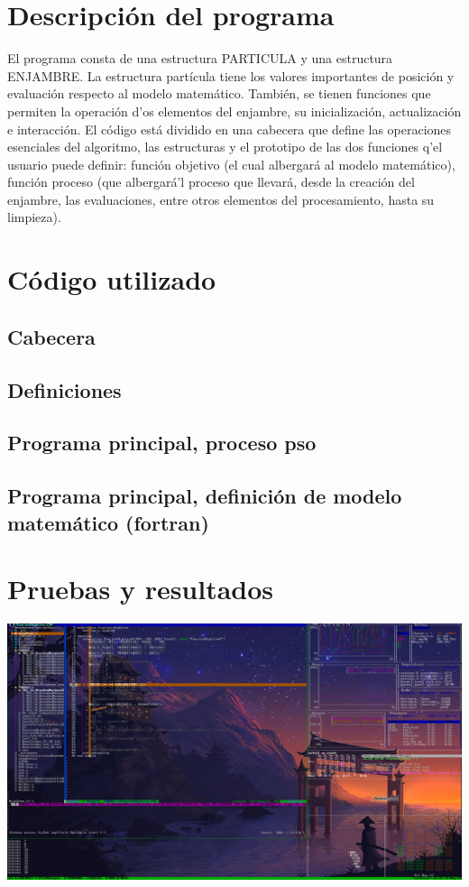 \documentclass[12pt,letterpaper]{report}
\begin{document}
  \section*{Descripción del programa}
  El programa consta de una estructura PARTICULA y una estructura ENJAMBRE. La estructura partícula tiene los valores
  importantes de posición y evaluación respecto al modelo matemático. También, se tienen funciones que permiten la
  operación d'os elementos del enjambre, su inicialización, actualización e interacción.
  El código está dividido en una cabecera que define las operaciones esenciales del algoritmo, las estructuras y el
  prototipo de las dos funciones q'el usuario puede definir: función objetivo (el cual albergará al modelo
  matemático), función proceso (que albergará'l proceso que llevará, desde la creación del enjambre, las evaluaciones,
  entre otros elementos del procesamiento, hasta su limpieza).
  \section*{Código utilizado}
  \subsection*{Cabecera}
  \newpage
  \subsection*{Definiciones}
  \newpage
  \subsection*{Programa principal, proceso pso}
  \newpage
  \subsection*{Programa principal, definición de modelo matemático (fortran)}
  \newpage
  \section*{Pruebas y resultados}
  \includegraphics[scale=0.2]{PRUEBA.png}
\end{document}
